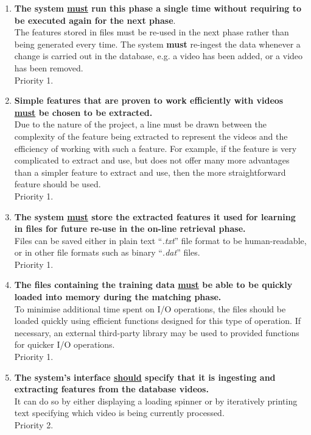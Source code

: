 \begin{enumerate}[label=F\arabic*]

    \item \textbf{The system \underline{must} run this phase a single time without requiring to be executed again for the next phase}.\\
    The features stored in files must be re-used in the next phase rather than being generated every time. The system \textbf{must} re-ingest the data whenever a change is carried out in the database, e.g. a video has been added, or a video has been removed.\\
    Priority 1.
    
    \item \textbf{Simple features that are proven to work efficiently with videos \underline{must} be chosen to be extracted.}\\
    Due to the nature of the project, a line must be drawn between the complexity of the feature being extracted to represent the videos and the efficiency of working with such a feature. For example, if the feature is very complicated to extract and use, but does not offer many more advantages than a simpler feature to extract and use, then the more straightforward feature should be used.\\
    Priority 1.
    
    \item \textbf{The system \underline{must} store the extracted features it used for learning in files for future re-use in the on-line retrieval phase.}\\
    Files can be saved either in plain text ``\textit{.txt}'' file format to be human-readable, or in other file formats such as binary ``\textit{.dat}'' files.\\
    Priority 1.
    
    \item \textbf{The files containing the training data \underline{must} be able to be quickly loaded into memory during the matching phase.}\\
    To minimise additional time spent on I/O operations, the files should be loaded quickly using efficient functions designed for this type of operation. If necessary, an external third-party library may be used to provided functions for quicker I/O operations.\\
    Priority 1.
    
    \item \textbf{The system's interface \underline{should} specify that it is ingesting and extracting features from the database videos.}\\
    It can do so by either displaying a loading spinner or by iteratively printing text specifying which video is being currently processed.\\
    Priority 2.
    
\end{enumerate}

